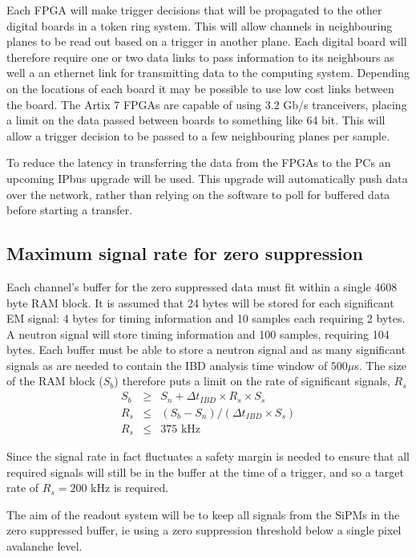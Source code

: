 \documentclass[a4paper]{article}
\begin{document}
Each FPGA will make trigger decisions that will be propagated to the other digital boards in a token ring system.
This will allow channels in neighbouring planes to be read out based on a trigger in another plane.
Each digital board will therefore require one or two data links to pass information to its neighbours as well a an ethernet link for transmitting data to the computing system.
Depending on the locations of each board it may be possible to use low cost links between the board.
The Artix 7 FPGAs are capable of using 3.2 Gb/s tranceivers, placing a limit on the data passed between boards to something like 64 bit.
This will allow a trigger decision to be passed to a few neighbouring planes per sample.

To reduce the latency in transferring the data from the FPGAs to the PCs an upcoming IPbus upgrade will be used.
This upgrade will automatically push data over the network, rather than relying on the software to poll for buffered data before starting a transfer.

\subsection{Maximum signal rate for zero suppression}
\label{maxrates}

Each channel's buffer for the zero suppressed data must fit within a single 4608 byte RAM block.
It is assumed that 24 bytes will be stored for each significant EM signal: 4 bytes for timing information and 10 samples each requiring 2 bytes.
A neutron signal will store timing information and 100 samples, requiring 104 bytes.
Each buffer must be able to store a neutron signal and as many significant signals as are needed to contain the IBD analysis time window of $500 \mu$s.
The size of the RAM block ($S_b$) therefore puts a limit on the rate of significant signals, $R_s$
\begin{eqnarray}
    S_b &\ge& S_n + \Delta t_{IBD}\times R_s \times S_s \\
    R_s &\le& (S_b - S_n) / (\Delta t_{IBD} \times S_s)\\
    R_s &\le& 375\mbox{ kHz}
\end{eqnarray}

Since the signal rate in fact fluctuates a safety margin is needed to ensure that all required signals will still be in the buffer at the time of a trigger, and so a target rate of $R_s = 200$ kHz is required.

The aim of the readout system will be to keep all signals from the SiPMs in the zero suppressed buffer, ie using a zero suppression threshold below a single pixel avalanche level.
\end{document}
